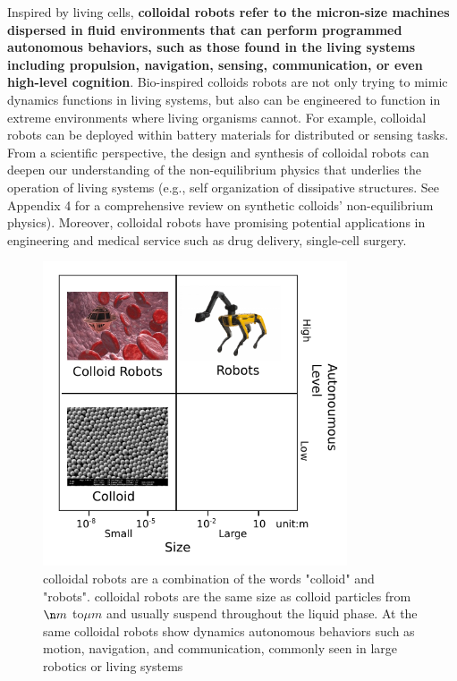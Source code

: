 Inspired by living cells, \textbf{colloidal robots refer to the micron-size machines  dispersed in fluid environments that can perform  programmed autonomous behaviors, such as those found in the living systems including propulsion, navigation, sensing, communication, or even high-level cognition}. Bio-inspired colloids robots are not only trying to mimic dynamics functions in living systems, but also can be engineered to function in extreme environments where living organisms cannot. For example, colloidal robots can be deployed within battery materials for distributed or sensing tasks. From a scientific perspective, the design and synthesis of colloidal robots can deepen our understanding of the non-equilibrium physics that underlies the operation of living systems (e.g., self organization of dissipative structures. See Appendix 4 for a comprehensive review on  synthetic colloids' non-equilibrium physics). Moreover, colloidal robots have promising potential applications in engineering and medical service such as drug delivery\autocite{fu2012controlled,de2017micromotor}, single-cell surgery\autocite{li2017micro}. 

\begin{figure}
\centering
\includegraphics[width=9cm]{figures/1_1.pdf}
\caption{colloidal robots are a combination of the words "colloid" and "robots". colloidal robots are the same size as colloid particles from $\n m$ to$\mu m$ and usually suspend throughout the liquid phase. At the same colloidal robots show dynamics autonomous behaviors such as motion, navigation, and communication, commonly seen in large robotics or living systems}
\label{fig:1.1}
\end{figure}


